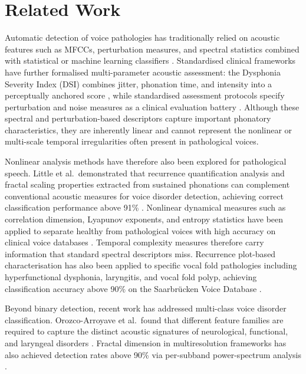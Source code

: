 \documentclass[runningheads]{llncs}
\begin{document}
  \section{Related Work}
  \label{sec:related_work}

  Automatic detection of voice pathologies has traditionally relied on acoustic features such as MFCCs, perturbation measures, and spectral statistics combined with statistical or machine learning classifiers \cite{godino2006,rai2025}. Standardised clinical frameworks have further formalised multi-parameter acoustic assessment: the Dysphonia Severity Index (DSI) combines jitter, phonation time, and intensity into a perceptually anchored score \cite{wuyts2000}, while standardised assessment protocols specify perturbation and noise measures as a clinical evaluation battery \cite{dejonckere2001}. Although these spectral and perturbation-based descriptors capture important phonatory characteristics, they are inherently linear and cannot represent the nonlinear or multi-scale temporal irregularities often present in pathological voices.

  Nonlinear analysis methods have therefore also been explored for pathological speech. Little et al.\ demonstrated that recurrence quantification analysis and fractal scaling properties extracted from sustained phonations can complement conventional acoustic measures for voice disorder detection, achieving correct classification performance above 91\% \cite{little2007b}. Nonlinear dynamical measures such as correlation dimension, Lyapunov exponents, and entropy statistics have been applied to separate healthy from pathological voices with high accuracy on clinical voice databases \cite{henriquez2009,little2009}. Temporal complexity measures therefore carry information that standard spectral descriptors miss. Recurrence plot-based characterisation has also been applied to specific vocal fold pathologies including hyperfunctional dysphonia, laryngitis, and vocal fold polyp, achieving classification accuracy above 90\% on the Saarbrücken Voice Database \cite{krishnan2026}.

  Beyond binary detection, recent work has addressed multi-class voice disorder classification. Orozco-Arroyave et al.\ found that different feature families are required to capture the distinct acoustic signatures of neurological, functional, and laryngeal disorders \cite{orozco2015}. Fractal dimension in multiresolution frameworks has also achieved detection rates above 90\% via per-subband power-spectrum analysis \cite{ali2016}.
\end{document}
